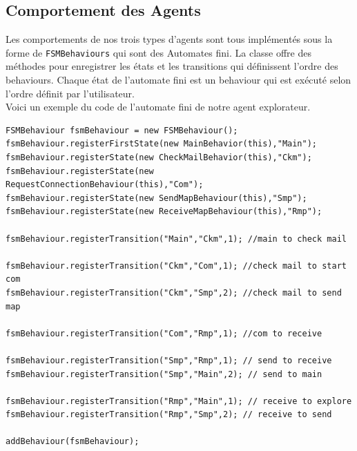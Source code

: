 \documentclass[10pt]{article}
\newcommand\tab[1][0.65cm]{\hspace*{#1}}
\begin{document}
	\subsection{Comportement des Agents}
	Les comportements de nos trois types d'agents sont tous implémentés sous la forme de \texttt{FSMBehaviours} qui sont des Automates fini. La classe offre des méthodes pour enregistrer les états et les transitions qui définissent l'ordre des behaviours.	Chaque état de l'automate fini est un behaviour qui est exécuté selon l'ordre définit par l'utilisateur.\\
\linebreak 
\tab Voici un exemple du code de l'automate fini de notre agent explorateur.
\begin{lstlisting}
FSMBehaviour fsmBehaviour = new FSMBehaviour();
fsmBehaviour.registerFirstState(new MainBehavior(this),"Main");
fsmBehaviour.registerState(new CheckMailBehavior(this),"Ckm");
fsmBehaviour.registerState(new RequestConnectionBehaviour(this),"Com");
fsmBehaviour.registerState(new SendMapBehaviour(this),"Smp");
fsmBehaviour.registerState(new ReceiveMapBehaviour(this),"Rmp");

fsmBehaviour.registerTransition("Main","Ckm",1); //main to check mail

fsmBehaviour.registerTransition("Ckm","Com",1); //check mail to start com
fsmBehaviour.registerTransition("Ckm","Smp",2); //check mail to send map

fsmBehaviour.registerTransition("Com","Rmp",1); //com to receive

fsmBehaviour.registerTransition("Smp","Rmp",1); // send to receive
fsmBehaviour.registerTransition("Smp","Main",2); // send to main

fsmBehaviour.registerTransition("Rmp","Main",1); // receive to explore
fsmBehaviour.registerTransition("Rmp","Smp",2); // receive to send

addBehaviour(fsmBehaviour);
\end{lstlisting}

\end{document}
